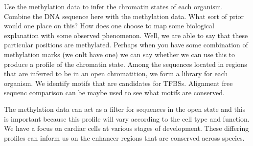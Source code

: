 Use the methylation data to infer the chromatin states of each organism. Combine the DNA sequence here with the methylation data. What sort of prior would one place on this? How does one choose to map some biological explanation with some observed phenomenon. Well, we are able to say that these particular positions are methylated. Perhaps when you have some combination of methylation marks (we onlt have one) we can say whether we can use this to produce a profile of the chromatin state. Among the sequences located in regions that are inferred to be in an open chromatition, we form a library for each organism. We identify motifs that are candidates for TFBSs. Alignment free sequenc comparison can be maybe used to see what motifs are conserved. 

The methylation data can act as a filter for sequences in the open state and this is important because this profile will vary according to the cell type and function. We have a focus on cardiac cells at various stages of development. These differing profiles can inform us on the enhancer regions that are conserved across species. 